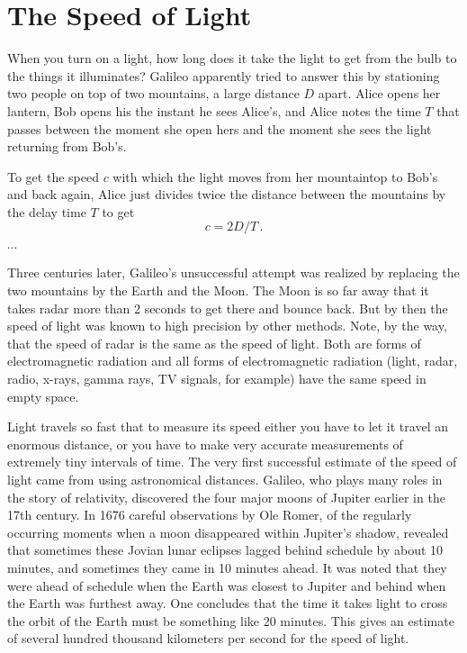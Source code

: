 \chapter{The Speed of Light}
\label{ch:Morin_03}

When you turn on a light, how long does it take the light to get from the bulb to the things it illuminates?
Galileo apparently tried to answer this by stationing two people on top of two mountains, a large distance $D$ apart. Alice opens her lantern, Bob opens his the instant he sees Alice's, and Alice notes the time $T$ that passes between the moment she open hers and the moment she sees the light returning from Bob's.

To get the speed $c$ with which the light moves from her mountaintop to Bob's and back again, Alice just divides twice the distance between the mountains by the delay time $T$ to get
\begin{equation}\label{eq:Morin_03.1}
c = 2 D / T\,. 
\end{equation}

$\cdots$

Three centuries later, Galileo's unsuccessful attempt was realized by replacing the two mountains by the Earth and the Moon. The Moon is so far away that it takes radar more than $2$ seconds to get there and bounce back. But by then the speed of light was known to high precision by other methods. Note, by the way, that the speed of radar is the same as the speed of light. Both are forms of electromagnetic radiation and all forms of electromagnetic radiation (light, radar, radio, x-rays, gamma rays, TV signals, for example) have the same speed in empty space. 

Light travels so fast that to measure its speed either you have to let it travel an enormous distance, or you have to make very accurate measurements of extremely tiny intervals of time. The very first successful estimate of the speed of light came from using astronomical distances. Galileo, who plays many roles in the story of relativity, discovered the four major moons of Jupiter earlier in the 17th century. In 1676 careful observations by Ole Romer, of the regularly occurring moments when a moon disappeared within Jupiter's shadow, revealed that sometimes these Jovian lunar eclipses lagged behind schedule by about 10 minutes, and sometimes they came in 10 minutes ahead. It was noted that they were ahead of schedule when the Earth was closest to Jupiter and behind when the Earth was furthest away. One concludes that the time it takes light to cross the orbit of the Earth must be something like 20 minutes. This gives an estimate of several hundred thousand kilometers per second for the speed of light. 

